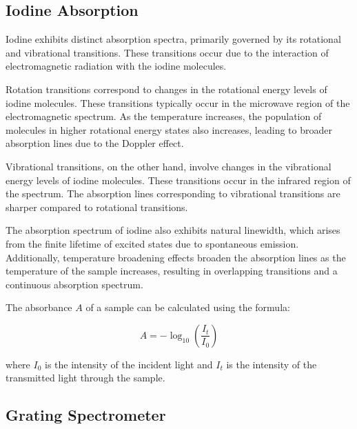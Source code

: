 \subsection{Iodine Absorption}

    Iodine exhibits distinct absorption spectra, primarily governed by its rotational and vibrational transitions. These transitions occur due to the interaction of electromagnetic radiation with the iodine molecules.

    Rotation transitions correspond to changes in the rotational energy levels of iodine molecules. These transitions typically occur in the microwave region of the electromagnetic spectrum. As the temperature increases, the population of molecules in higher rotational energy states also increases, leading to broader absorption lines due to the Doppler effect.
    
    Vibrational transitions, on the other hand, involve changes in the vibrational energy levels of iodine molecules. These transitions occur in the infrared region of the spectrum. The absorption lines corresponding to vibrational transitions are sharper compared to rotational transitions.
    
    The absorption spectrum of iodine also exhibits natural linewidth, which arises from the finite lifetime of excited states due to spontaneous emission. Additionally, temperature broadening effects broaden the absorption lines as the temperature of the sample increases, resulting in overlapping transitions and a continuous absorption spectrum.
    
    The absorbance $A$ of a sample can be calculated using the formula:
    
\begin{equation}
    A = -\log_{10}\left(\frac{I_t}{I_0}\right)
\end{equation}
    
    where 
    $I_0$ is the intensity of the incident light and
    $I_t$ is the intensity of the transmitted light through the sample.

\subsection{Grating Spectrometer}





